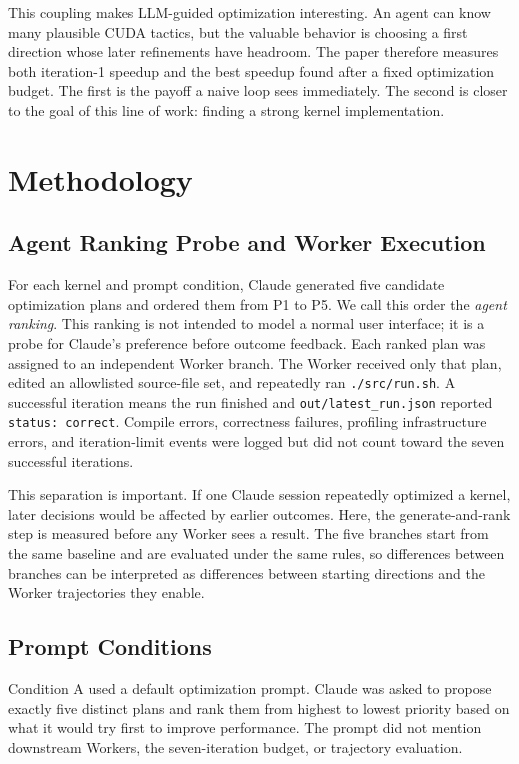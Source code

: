 \documentclass[conference]{IEEEtran}
\begin{document}
This coupling makes LLM-guided optimization interesting. An agent can know
many plausible CUDA tactics, but the valuable behavior is choosing a first
direction whose later refinements have headroom. The paper therefore measures
both iteration-1 speedup and the best speedup found after a fixed optimization
budget. The first is the payoff a naive loop sees immediately. The second is
closer to the goal of this line of work: finding a strong kernel implementation.

\section{Methodology}

\subsection{Agent Ranking Probe and Worker Execution}

For each kernel and prompt condition, Claude generated five candidate
optimization plans and ordered them from P1 to P5. We call this order the
\emph{agent ranking}. This ranking is not intended to model a normal user
interface; it is a probe for Claude's preference before outcome feedback. Each
ranked plan was assigned to an independent Worker branch. The Worker received
only that plan, edited an allowlisted source-file set, and repeatedly ran
\texttt{./src/run.sh}. A successful iteration means the run finished and
\texttt{out/latest\_run.json} reported \texttt{status: correct}. Compile
errors, correctness failures, profiling infrastructure errors, and
iteration-limit events were logged but did not count toward the seven
successful iterations.

This separation is important. If one Claude session repeatedly optimized a
kernel, later decisions would be affected by earlier outcomes. Here, the
generate-and-rank step is measured before any Worker sees a result. The five
branches start from the same baseline and are evaluated under the same rules,
so differences between branches can be interpreted as differences between
starting directions and the Worker trajectories they enable.

\subsection{Prompt Conditions}

Condition A used a default optimization prompt. Claude was asked to propose
exactly five distinct plans and rank them from highest to lowest priority based
on what it would try first to improve performance. The prompt did not mention
downstream Workers, the seven-iteration budget, or trajectory evaluation.
\end{document}
